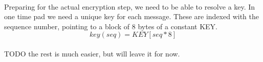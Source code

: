 \documentclass[fleqn]{kththesis}
\begin{document}
\paragraph{}
Preparing for the actual encryption step, we need to be able to resolve a key. In one time pad we need a unique key for each message. These are indexed with the sequence number, pointing to a block of 8 bytes of a constant KEY. 
\begin{equation*}
key(seq) = KEY[seq*8]
\end{equation*}

\paragraph{}
TODO the rest is much easier, but will leave it for now.


\begin{comment}
\subsubsection{Non-interference and leaking of data}
Looking at above definitions, if we have equivalence of the code to the model above, we need not consider non-interference for $f$ or those functions that only take public input. Proving that equivalence for some notion of equivalence may however still require such properties to be shown. A first draft of such properties follow below:

\paragraph{}
Let $R_{i}$ be the i-th memory mapped register and let $READ(R_{i})$ and $WRITE(R_{i})$ denote generalized read and write events to these registers. Then let $R_{in}$ and $R_{out}$ denote the memory mapped registers used for input and output respectively according to the specification.

\paragraph{}
The property of unidirectionality:
$$R_{in} \neq R_{out}$$

\paragraph{}
Single input property:
$$READ(R_{i}) \implies i = in$$

\paragraph{}
Single output property:
$$WRITE(R_{i}) \implies i = out$$

\paragraph{}
No output property:
$$\neg WRITE(R_{i})$$

\end{comment}
\end{document}
